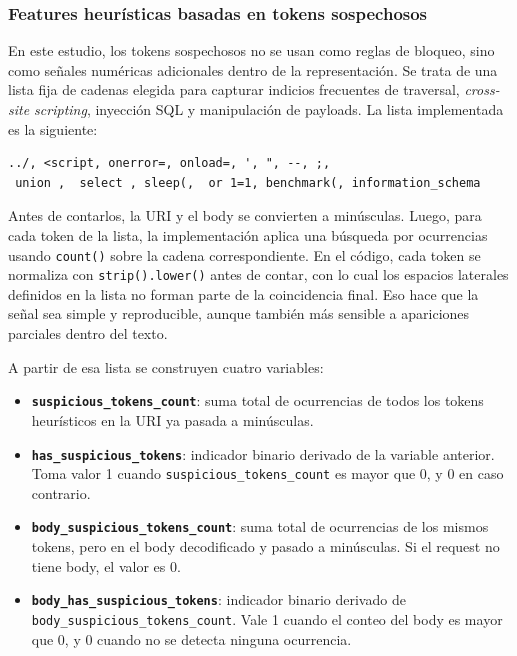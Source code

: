 \documentclass[12pt,oneside]{report}
\begin{document}
\subsubsection{Features heurísticas basadas en tokens sospechosos}
En este estudio, los tokens sospechosos no se usan como reglas de bloqueo, sino como señales numéricas adicionales dentro de la representación. Se trata de una lista fija de cadenas elegida para capturar indicios frecuentes de traversal, \textit{cross-site scripting}, inyección SQL y manipulación de payloads. La lista implementada es la siguiente:

\begin{verbatim}
../, <script, onerror=, onload=, ', ", --, ;,
 union ,  select , sleep(,  or 1=1, benchmark(, information_schema
\end{verbatim}

Antes de contarlos, la URI y el body se convierten a minúsculas. Luego, para cada token de la lista, la implementación aplica una búsqueda por ocurrencias usando \texttt{count()} sobre la cadena correspondiente. En el código, cada token se normaliza con \texttt{strip().lower()} antes de contar, con lo cual los espacios laterales definidos en la lista no forman parte de la coincidencia final. Eso hace que la señal sea simple y reproducible, aunque también más sensible a apariciones parciales dentro del texto.

A partir de esa lista se construyen cuatro variables:

\begin{itemize}[leftmargin=*]
  \item \textbf{\texttt{suspicious\_tokens\_count}}: suma total de ocurrencias de todos los tokens heurísticos en la URI ya pasada a minúsculas.

  \item \textbf{\texttt{has\_suspicious\_tokens}}: indicador binario derivado de la variable anterior. Toma valor 1 cuando \texttt{suspicious\_tokens\_count} es mayor que 0, y 0 en caso contrario.

  \item \textbf{\texttt{body\_suspicious\_tokens\_count}}: suma total de ocurrencias de los mismos tokens, pero en el body decodificado y pasado a minúsculas. Si el request no tiene body, el valor es 0.

  \item \textbf{\texttt{body\_has\_suspicious\_tokens}}: indicador binario derivado de \texttt{body\_suspicious\_tokens\_count}. Vale 1 cuando el conteo del body es mayor que 0, y 0 cuando no se detecta ninguna ocurrencia.
\end{itemize}
\end{document}

